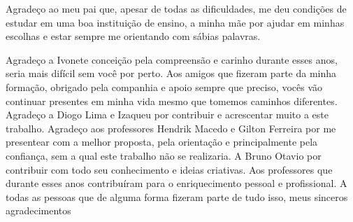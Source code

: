 \begin{agradecimentos}
Agradeço ao meu pai que, apesar de todas as dificuldades, me deu condições de
estudar em uma boa instituição de ensino, a minha mãe por ajudar em minhas escolhas e estar sempre me orientando com sábias palavras.

Agradeço a Ivonete conceição pela compreensão e carinho durante
esses anos, seria mais difícil sem você por perto. Aos amigos que fizeram parte da minha
formação, obrigado pela companhia e apoio sempre que preciso, vocês vão continuar
presentes em minha vida mesmo que tomemos caminhos diferentes.
Agradeço a Diogo Lima e Izaqueu por contribuir e acrescentar muito a este trabalho.
Agradeço aos professores Hendrik Macedo e Gilton Ferreira por me presentear com a melhor proposta,
pela orientação e principalmente pela confiança, sem a qual este trabalho não se realizaria.
A Bruno Otavio por contribuir com todo seu conhecimento e ideias criativas. Aos professores que durante esses anos contribuíram para o enriquecimento pessoal e profissional.
A todas as pessoas que de alguma forma fizeram parte de tudo isso, meus sinceros
agradecimentos
\end{agradecimentos}

